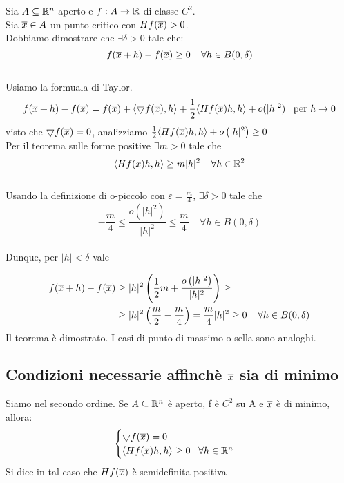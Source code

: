 \documentclass[12pt]{article}
\begin{document}
Sia $A\subseteq \mathbb{R}^n$ aperto e $f: A \to \mathbb{R}$ di classe $C^2$.\\
Sia $\overline{x} \in A$ un punto critico con $Hf(\overline{x}) > 0$.\\
Dobbiamo dimostrare che $\exists \delta >0$ tale che:
$$
    f(\overline{x}+h) - f(\overline{x}) \geq 0 \;\;\;\; \forall h\in B(0,\delta)
$$
\\
Usiamo la formuala di Taylor.
$$
    f(\overline{x} + h)-f(\overline{x}) = f(\overline{x}) + \langle \bigtriangledown f(\overline{x}), h \rangle + \frac{1}{2}\langle Hf(\overline{x})h, h \rangle + o(\rvert h \rvert ^2)\;\;\;\text{per } h\to 0
$$
visto che $\bigtriangledown f(\overline{x}) = 0$, analizziamo $ \frac{1}{2}\langle Hf(\overline{x})h, h\rangle + o\left(\vert h\vert^2\right) \geq 0 $\\
Per il teorema sulle forme positive $\exists m>0$ tale che
$$
    \langle Hf(x)h, h\rangle\geq m \vert h\vert^2\;\;\;\;\forall h\in \mathbb{R}^2
$$
\\
Usando la definizione di o-piccolo con $\varepsilon = \frac{m}{4}$, $\exists \delta >0$ tale che
$$
    -\frac{m}{4} \leq \frac{o(\vert h\vert^2)}{\vert h\vert^2}\leq\frac{m}{4} \;\;\;\;\forall h\in B(0,\delta)
$$
\\
Dunque, per $\vert h\vert <\delta$ vale

\begin{align*}
    f(\overline{x}+h) - f(\overline{x}) & \geq \vert h\vert^2 \left(\frac{1}{2}m + \frac{o\left(\vert h\vert^2\right)}{\vert h\vert^2}\right)\geq                        \\
                      & \geq \vert h\vert^2 \left(\frac{m}{2} - \frac{m}{4}\right) = \frac{m}{4}\vert h\vert^2 \geq 0 \;\;\;\;\forall h\in B(0,\delta)
\end{align*}
Il teorema è dimostrato. I casi di punto di massimo o sella sono analoghi.


\subsection{Condizioni necessarie affinchè $\overline{x}$ sia di minimo}
Siamo nel secondo ordine. Se $A\subseteq \mathbb{R}^n$ è aperto, f è $C^2$ su A e $\overline{x}$ è di minimo, allora:
$$
    \begin{cases}
        \bigtriangledown f(\overline{x}) = 0 \\
        \langle Hf(\overline{x})h, h \rangle \geq 0 \;\;\;\forall h\in\mathbb{R}^n
    \end{cases}
$$
Si dice in tal caso che $Hf(\overline{x})$ è semidefinita positiva
\end{document}
